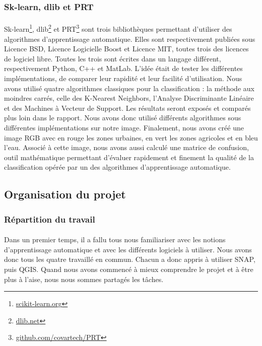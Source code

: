 \documentclass[a4paper,10pt]{report}
\begin{document}
\subsubsection{Sk-learn, dlib et PRT}
\paragraph{}
Sk-learn\footnote{\href{http://scikit-learn.org}{scikit-learn.org}}, dlib\footnote{\href{http://dlib.net}{dlib.net}} et PRT\footnote{\href{https://github.com/covartech/PRT}{github.com/covartech/PRT}} sont trois bibliothèques permettant d'utiliser des algorithmes d'apprentissage automatique. Elles sont respectivement publiées sous Licence BSD, Licence Logicielle Boost et Licence MIT, toutes trois des licences de logiciel libre. Toutes les trois sont écrites dans un langage différent, respectivement Python, C++ et MatLab. L'idée était de tester les différentes implémentations, de comparer leur rapidité et leur facilité d'utilisation. Nous avons utilisé quatre algorithmes classiques pour la classification : la méthode aux moindres carrés, celle des K-Nearest Neighbors, l'Analyse Discriminante Linéaire et des Machines à Vecteur de Support. Les résultats seront exposés et comparés plus loin dans le rapport. Nous avons donc utilisé différents algorithmes sous différentes implémentations sur notre image. Finalement, nous avons créé une image RGB avec en rouge les zones urbaines, en vert les zones agricoles et en bleu l'eau. Associé à cette image, nous avons aussi calculé une matrice de confusion, outil mathématique permettant d'évaluer rapidement et finement la qualité de la classification opérée par un des algorithmes d'apprentissage automatique.
\subsection{Organisation du projet}
\subsubsection{Répartition du travail}
\paragraph{}
Dans un premier temps, il a fallu tous nous familiariser avec les notions d'apprentissage automatique et avec les différents logiciels à utiliser. Nous avons donc tous les quatre travaillé en commun. Chacun a donc appris à utiliser SNAP, puis QGIS. Quand nous avons commencé à mieux comprendre le projet et à être plus à l'aise, nous nous sommes partagés les tâches.
\end{document}
